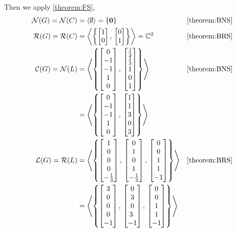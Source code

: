 \documentclass{ximera}
\begin{document}
\begin{example}
  Then we apply \ref{theorem:FS},
  \begin{align*}
    \nsp{G}=\nsp{C}&=
                     \spn{\emptyset}
                     =\set{\zerovector}
    &&\ref{theorem:BNS}\\
    \rsp{G}=\rsp{C}&=
                     \spn{\set{
                     \colvector{1 \\ 0},\,
    \colvector{0 \\ 1}
    }}
    =\complex{2}
                   &&\ref{theorem:BRS}\\
    \csp{G}=\nsp{L}&=
                     \spn{\set{
                     \colvector{0\\-1\\-1\\1\\0},\,
    \colvector{\frac{1}{3}\\\frac{1}{3}\\1\\0\\1}
    }}&&\ref{theorem:BNS}\\
                   &=\spn{\set{
                     \colvector{0\\-1\\-1\\1\\0},\,
    \colvector{1\\1\\3\\0\\3}
    }}\\
    \lns{G}=\rsp{L}&=
                     \spn{\set{
                     \colvector{1 \\ 0 \\ 0 \\ 0 \\ -\frac{1}{3}},\,
    \colvector{0 \\ 1  \\ 0 \\ 1 \\ -\frac{1}{3}},\,
    \colvector{0 \\ 0 \\ 1  \\ 1 \\ -1}
    }}&&\ref{theorem:BRS}\\
                   &=\spn{\set{
                     \colvector{3 \\ 0 \\ 0 \\ 0 \\ -1},\,
    \colvector{0 \\ 3  \\ 0 \\ 3\ \\ -1},\,
    \colvector{0 \\ 0 \\ 1  \\ 1 \\ -1}
    }}
  \end{align*}


\end{example}
\end{document}
